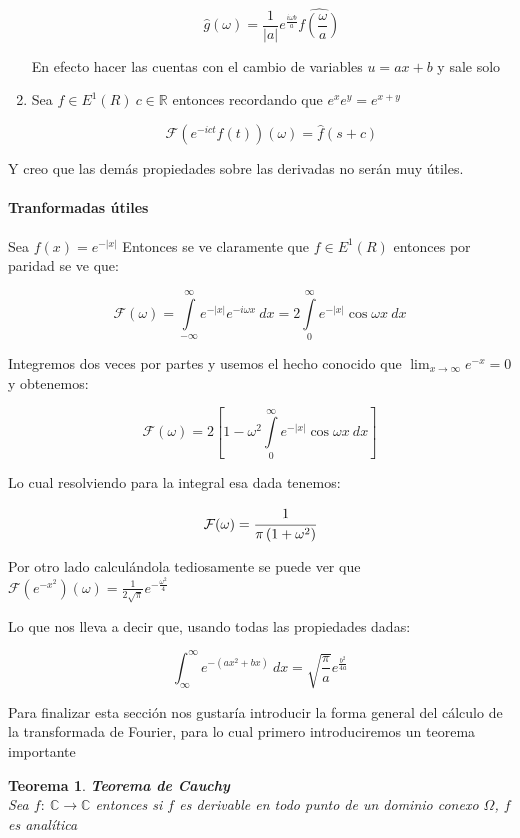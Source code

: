 \documentclass[a4paper,spanish]{article}
\def\Fou {\mathcal{F}}
\def\C {\mathbb{C}}
\def\R {\mathbb{R}}
\newtheorem{teo}[prop]{Teorema}
\numberwithin{equation}{section}
\begin{document}
\begin{enumerate}
\[\widehat{g}(\omega)= \frac{1}{\vert{a}\vert}e^{\frac{i \omega b}{a}}\widehat{f(\frac{\omega}{a})} \]

En efecto hacer las cuentas con el cambio de variables $u=ax+b$ y sale solo
\item Sea $f \in E^1(R)\ c\in \R$ entonces recordando que $e^xe^y=e^{x+y}$

\[\Fou(e^{-ict}f(t))(\omega)= \widehat{f}(s+c)\] 
\end{enumerate}

Y creo que las dem\'as propiedades sobre las derivadas no ser\'an muy \'utiles.

\paragraph{Tranformadas \'utiles}

Sea $f(x)=e^{-\vert{x}\vert}$ Entonces se ve claramente que $f \in E^1(R)$ entonces por paridad se ve que:

\[\Fou(\omega)=\int\limits_{-\infty}^{\infty}{e^{-\vert{x}\vert}e^{-i\omega x}} \ dx = 2 \int\limits_{0}^{\infty}{e^{-\vert{x}\vert}\cos{\omega x}} \ dx \]

Integremos dos veces por partes y usemos el hecho conocido que $\lim_{x \rightarrow \infty}{e^{-x}}=0$ y obtenemos:

\[\Fou(\omega)= 2 \left[{1-\omega^2 \int\limits_{0}^{\infty}{e^{-\vert{x}\vert}\cos{\omega x}} \ dx  }\right] \]

Lo cual resolviendo para la integral esa dada tenemos:


\[\Fou(\omega) = \cfrac {1}{\pi \left({1+\omega^2}\right)}\]

Por otro lado calcul\'andola tediosamente se puede ver que $\Fou (e^{-x^2})(\omega)= \frac{1}{2\sqrt{\pi}} e^{-\frac{\omega^2}{4}}$

Lo que nos lleva a decir que, usando todas las propiedades dadas:

\begin{equation}
\int_{\infty}^{\infty}{e^{-\left({ax^2+bx}\right)}} \ dx = \sqrt{\frac{\pi}{a}}e^{\frac{b^2}{4a}}
\label{fourier_rel_disp}
\end{equation}

Para finalizar esta secci\'on nos gustar\'ia introducir la forma general del c\'alculo de la transformada de Fourier, para lo cual primero introduciremos un teorema importante

\begin{teo}\textbf{Teorema de Cauchy}
\\
Sea $f: \ \C \rightarrow \C$ entonces si $f$ es derivable en todo punto de un dominio conexo $\Omega$, $f$ es anal\'itica
\end{teo}
\end{document}
